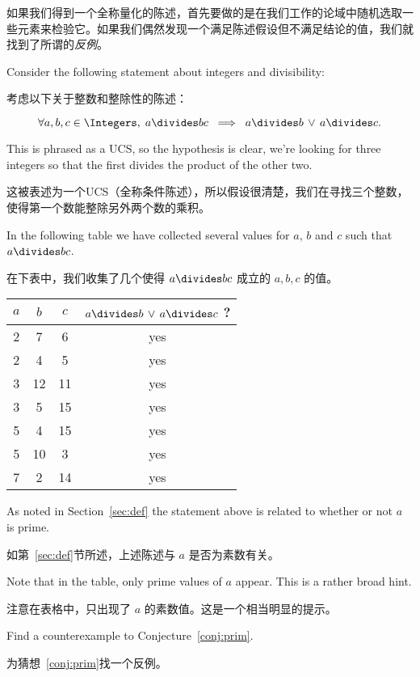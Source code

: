 如果我们得到一个全称量化的陈述，首先要做的是在我们工作的论域中随机选取一些元素来检验它。如果我们偶然发现一个满足陈述假设但不满足结论的值，我们就找到了所谓的\emph{反例}。

Consider the following statement about integers and divisibility:

考虑以下关于整数和整除性的陈述：

\begin{conj} \label{conj:prim}
      \[ \forall a,b,c \in \Integers, \; a \divides bc \; \implies \; a \divides b \,
            \lor \, a \divides c. \]
\end{conj}

This is phrased as a UCS, so the hypothesis is clear, we're looking
for three integers so that the first divides the product of the other
two.

这被表述为一个UCS（全称条件陈述），所以假设很清楚，我们在寻找三个整数，使得第一个数能整除另外两个数的乘积。

In the following table we have collected several values for
$a$, $b$ and $c$ such that $a \divides bc$.

在下表中，我们收集了几个使得 $a \divides bc$ 成立的 $a, b, c$ 的值。
\begin{center}
      \begin{tabular}{c|c|c|c}
            $a$ & $b$ & $c$ & $ a \divides b \, \lor \, a \divides c $ ? \\ \hline
            2   & 7   & 6   & yes                                        \\
            2   & 4   & 5   & yes                                        \\
            3   & 12  & 11  & yes                                        \\
            3   & 5   & 15  & yes                                        \\
            5   & 4   & 15  & yes                                        \\
            5   & 10  & 3   & yes                                        \\
            7   & 2   & 14  & yes                                        \\
      \end{tabular}
\end{center}

\begin{exer}
      As noted in Section~\ref{sec:def} the statement above is related to
      whether or not $a$ is prime.

      如第~\ref{sec:def}节所述，上述陈述与 $a$ 是否为素数有关。

      Note that in the table, only prime
      values of $a$ appear.  This is a rather broad hint.

      注意在表格中，只出现了 $a$ 的素数值。这是一个相当明显的提示。

      Find a
      counterexample to Conjecture~\ref{conj:prim}.

      为猜想~\ref{conj:prim}找一个反例。
\end{exer}

